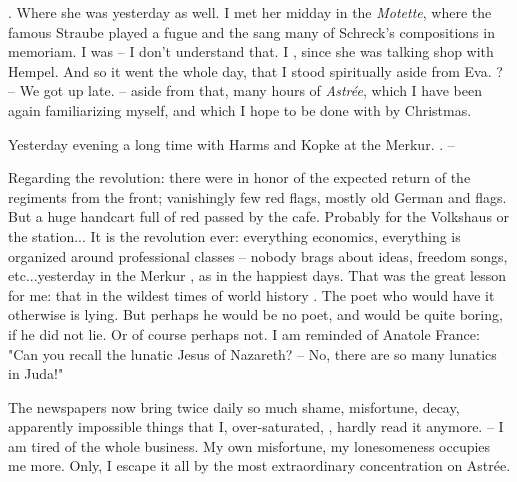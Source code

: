 
. Where she was yesterday as well. I met her midday in the \textit{Motette}, where the famous Straube played a fugue and the  sang many of Schreck's compositions in memoriam. I was  -- I don't understand that. I , since she was talking shop with Hempel. And so it went the whole day, that I stood spiritually aside from Eva. ? -- We got up late.  -- aside from that, many hours of \textit{Astrée}, which I have been again familiarizing myself, and which I hope to be done with by Christmas.

Yesterday evening a long time with Harms and Kopke at the Merkur. . --

Regarding the revolution: there were  in honor of the expected return of the regiments from the front; vanishingly few red flags, mostly old German and  flags. But a huge handcart full of red  passed by the cafe. Probably for the Volkshaus or the station... It is the  revolution ever: everything  economics, everything is organized around professional classes -- nobody brags about ideas, freedom songs, etc...yesterday in the Merkur , as in the happiest days. That was the great lesson for me: that in the wildest times of world history . The poet who would have it otherwise is lying. But perhaps he would be no poet, and would be quite boring, if he did not lie. Or of course perhaps not. I am reminded of Anatole France: "Can you recall the lunatic Jesus of Nazareth? -- No, there are so many lunatics in Juda!"

The newspapers now bring twice daily so much shame, misfortune, decay, apparently impossible things that I, over-saturated, , hardly read it anymore.  -- I am tired of the whole business. My own misfortune, my lonesomeness occupies me more. Only, I escape it all by the most extraordinary concentration on Astrée.

